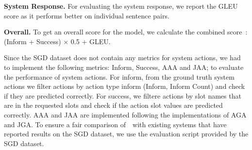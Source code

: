 \textbf{System Response.} For evaluating the system response, we report the GLEU~\cite{wu2016googles} score as it performs better on individual sentence pairs.

\textbf{Overall.} To get an overall score for the model, we calculate the combined score~\cite{mehri2019structured}: (Inform + Success) $\times$ 0.5 + GLEU.

Since the SGD dataset does not contain any metrics for system actions, we had to implement the following metrics: Inform, Success, AAA and JAA;
to evaluate the performance of system actions.
For inform, from the ground truth system actions we filter actions by action type inform (Inform, Inform Count)
and check if they are predicted correctly. For success, we filtere actions by slot names that are in the requested slots and
check if the action slot values are predicted correctly. AAA and JAA are implemented following the implementations of AGA and JGA.
To ensure a fair comparison of~\oursys~with existing systems that have reported results on the SGD dataset,
we use the evaluation script provided by the SGD dataset.



